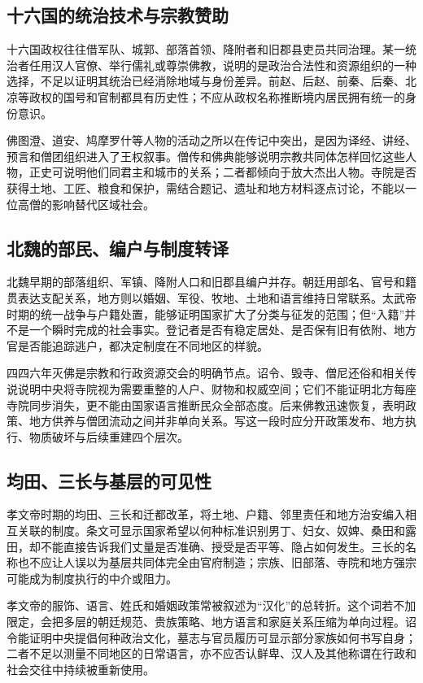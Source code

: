 \subsection{十六国的统治技术与宗教赞助}

十六国政权往往借军队、城郭、部落首领、降附者和旧郡县吏员共同治理。某一统治者任用汉人官僚、举行儒礼或尊崇佛教，说明的是政治合法性和资源组织的一种选择，不足以证明其统治已经消除地域与身份差异。前赵、后赵、前秦、后秦、北凉等政权的国号和官制都具有历史性；不应从政权名称推断境内居民拥有统一的身份意识。

佛图澄、道安、鸠摩罗什等人物的活动之所以在传记中突出，是因为译经、讲经、预言和僧团组织进入了王权叙事。僧传和佛典能够说明宗教共同体怎样回忆这些人物，正史可说明他们同君主和城市的关系；二者都倾向于放大杰出人物。寺院是否获得土地、工匠、粮食和保护，需结合题记、遗址和地方材料逐点讨论，不能以一位高僧的影响替代区域社会。

\subsection{北魏的部民、编户与制度转译}

北魏早期的部落组织、军镇、降附人口和旧郡县编户并存。朝廷用部名、官号和籍贯表达支配关系，地方则以婚姻、军役、牧地、土地和语言维持日常联系。太武帝时期的统一战争与户籍处置，能够证明国家扩大了分类与征发的范围；但“入籍”并不是一个瞬时完成的社会事实。登记者是否有稳定居处、是否保有旧有依附、地方官是否能追踪逃户，都决定制度在不同地区的样貌。

四四六年灭佛是宗教和行政资源交会的明确节点。诏令、毁寺、僧尼还俗和相关传说说明中央将寺院视为需要重整的人户、财物和权威空间；它们不能证明北方每座寺院同步消失，更不能由国家语言推断民众全部态度。后来佛教迅速恢复，表明政策、地方供养与僧团流动之间并非单向关系。写这一段时应分开政策发布、地方执行、物质破坏与后续重建四个层次。

\subsection{均田、三长与基层的可见性}

孝文帝时期的均田、三长和迁都改革，将土地、户籍、邻里责任和地方治安编入相互关联的制度。条文可显示国家希望以何种标准识别男丁、妇女、奴婢、桑田和露田，却不能直接告诉我们丈量是否准确、授受是否平等、隐占如何发生。三长的名称也不应让人误以为基层共同体完全由官府制造；宗族、旧部落、寺院和地方强宗可能成为制度执行的中介或阻力。

孝文帝的服饰、语言、姓氏和婚姻政策常被叙述为“汉化”的总转折。这个词若不加限定，会把多层的朝廷规范、贵族策略、地方语言和家庭关系压缩为单向过程。诏令能证明中央提倡何种政治文化，墓志与官员履历可显示部分家族如何书写自身；二者不足以测量不同地区的日常语言，亦不应否认鲜卑、汉人及其他称谓在行政和社会交往中持续被重新使用。

